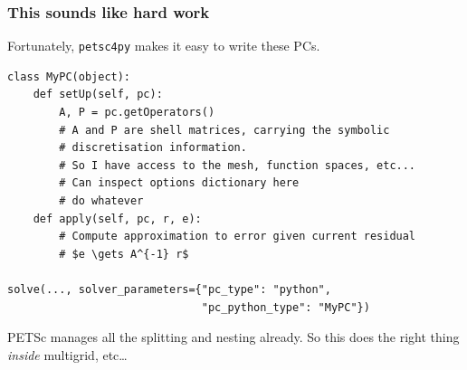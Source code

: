 \documentclass[presentation,aspectratio=43]{beamer}
\begin{document}
\begin{frame}[fragile]
  \frametitle{This sounds like hard work}
  Fortunately, \texttt{petsc4py} makes it easy to write these PCs.
\begin{verbatim}
class MyPC(object):
    def setUp(self, pc):
        A, P = pc.getOperators()
        # A and P are shell matrices, carrying the symbolic
        # discretisation information.
        # So I have access to the mesh, function spaces, etc...
        # Can inspect options dictionary here
        # do whatever
    def apply(self, pc, r, e):
        # Compute approximation to error given current residual
        # $e \gets A^{-1} r$

solve(..., solver_parameters={"pc_type": "python",
                              "pc_python_type": "MyPC"})
\end{verbatim}
  PETSc manages all the splitting and nesting already.  So this does
  the right thing \emph{inside} multigrid, etc\ldots
\end{frame}
\end{document}
